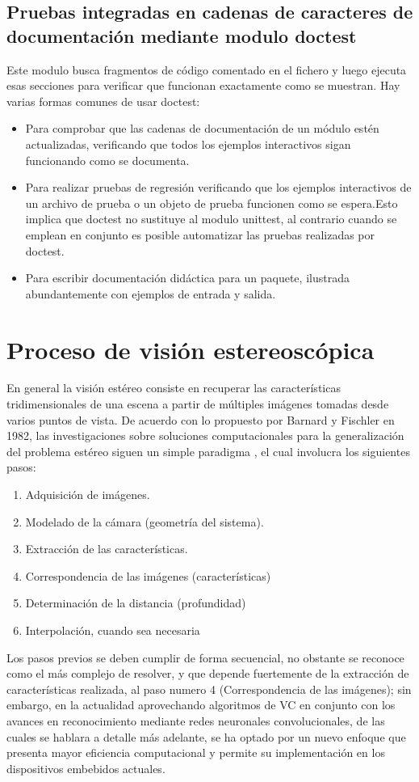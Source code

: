 \subsection{Pruebas integradas en cadenas de caracteres de documentación mediante modulo doctest}
Este modulo busca fragmentos de código comentado en el fichero y luego ejecuta esas secciones para verificar que funcionan exactamente como se muestran. Hay varias formas comunes de usar doctest:
\begin{itemize}
    \item Para comprobar que las cadenas de documentación de un módulo estén actualizadas, verificando que todos los ejemplos interactivos sigan funcionando como se documenta.
    \item Para realizar pruebas de regresión verificando que los ejemplos interactivos de un archivo de prueba o un objeto de prueba funcionen como se espera.Esto implica que doctest no sustituye al modulo unittest, al contrario cuando se emplean en conjunto es posible automatizar las pruebas realizadas por doctest.
    \item Para escribir documentación didáctica para un paquete, ilustrada abundantemente con ejemplos de entrada y salida.
\end{itemize}
\section{Proceso de visión estereoscópica}
En general la visión estéreo consiste en recuperar las características tridimensionales de una escena a partir de múltiples imágenes tomadas desde varios puntos de vista. De acuerdo con lo propuesto por Barnard y Fischler en 1982, las investigaciones sobre soluciones computacionales para la generalización del problema estéreo siguen un simple paradigma \cite{Barnard1982}, el cual involucra los siguientes pasos:
\begin{enumerate}
\item Adquisición de imágenes.
\item Modelado de la cámara (geometría del sistema).
\item Extracción de las características.
\item Correspondencia de las imágenes (características)
\item Determinación de la distancia (profundidad)
\item Interpolación, cuando sea necesaria
\end{enumerate}
Los pasos previos se deben cumplir de forma secuencial, no obstante se reconoce como el más complejo de resolver, y que depende fuertemente de la extracción de características realizada, al paso numero 4 (Correspondencia de las imágenes); sin embargo, en la actualidad aprovechando algoritmos de VC en conjunto con los avances en reconocimiento mediante redes neuronales convolucionales, de las cuales se hablara a detalle más adelante, se ha optado por un nuevo enfoque que presenta mayor eficiencia computacional y permite su implementación en los dispositivos embebidos actuales. 
